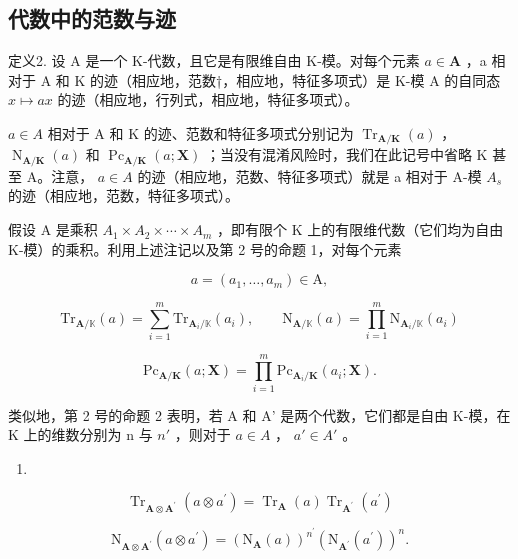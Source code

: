 \subsection{代数中的范数与迹}

定义2. 设 A 是一个 K-代数，且它是有限维自由 K-模。对每个元素 \(a \in \mathbf{A}\) ，a 相对于 A 和 K 的迹（相应地，范数†，相应地，特征多项式）是 K-模 A 的自同态 \(x \mapsto ax\) 的迹（相应地，行列式，相应地，特征多项式）。

 \(a \in A\) 相对于 A 和 K 的迹、范数和特征多项式分别记为 \(\operatorname{Tr}_{\mathbf{A}/\mathbf{K}}(a)\) ， \(\operatorname{N}_{\mathbf{A}/\mathbf{K}}(a)\) 和 \(\operatorname{Pc}_{\mathbf{A}/\mathbf{K}}(a; \mathbf{X})\) ；当没有混淆风险时，我们在此记号中省略 K 甚至 A。注意， \(a \in A\) 的迹（相应地，范数、特征多项式）就是 a 相对于 A-模 \(A_{s}\) 的迹（相应地，范数，特征多项式）。

假设 A 是乘积 \(A_{1} \times A_{2} \times \cdots \times A_{m}\) ，即有限个 K 上的有限维代数（它们均为自由 K-模）的乘积。利用上述注记以及第 2 号的命题 1，对每个元素

\[
a = (a _ {1}, \dots , a _ {m}) \in \mathrm{A},
\]

\[
\mathrm{Tr} _ {\mathbf {A} / \mathbb {K}} (a) = \sum_ {i = 1} ^ {m} \mathrm{Tr} _ {\mathbf {A} _ {i} / \mathbb {K}} (a _ {i}), \qquad \mathrm{N} _ {\mathbf {A} / \mathbb {K}} (a) = \prod_ {i = 1} ^ {m} \mathrm{N} _ {\mathbf {A} _ {i} / \mathbb {K}} (a _ {i})\tag{18}
\]

\[
\mathrm{Pc} _ {\mathbf {A} / \mathbf {K}} (a; \mathbf {X}) = \prod_ {i = 1} ^ {m} \mathrm{Pc} _ {\mathbf {A} _ {i} / \mathbf {K}} (a _ {i}; \mathbf {X}).
\]

类似地，第 2 号的命题 2 表明，若 A 和 A' 是两个代数，它们都是自由 K-模，在 K 上的维数分别为 n 与 \(n'\) ，则对于 \(a \in A\) ， \(a' \in A'\) 。

\begin{enumerate}
\def\labelenumi{(\arabic{enumi})}
\setcounter{enumi}{18}
\tightlist
\item
\end{enumerate}

\[
\operatorname{Tr} _ {\mathbf {A} \otimes \mathbf {A} ^ {\prime}} (a \otimes a ^ {\prime}) = \operatorname{Tr} _ {\mathbf {A}} (a) \operatorname{Tr} _ {\mathbf {A} ^ {\prime}} (a ^ {\prime})\tag{20}
\]

\[
\mathrm{N} _ {\mathbf {A} \otimes \mathbf {A} ^ {\prime}} (a \otimes a ^ {\prime}) = (\mathrm{N} _ {\mathbf {A}} (a)) ^ {n ^ {\prime}} (\mathrm{N} _ {\mathbf {A} ^ {\prime}} (a ^ {\prime})) ^ {n}.
\]

